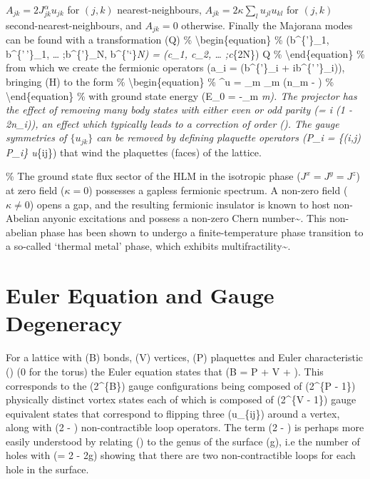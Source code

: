 \(A_{jk}=2J^\alpha_{jk}u_{jk}\) for \((j, k)\) nearest-neighbours,
\(A_{jk}=2\kappa\sum_l u_{jl}u_{kl}\) for \((j,k)\)
second-nearest-neighbours, and \(A_{jk}=0\) otherwise. Finally the
Majorana modes can be found with a transformation (Q) \%
\textbackslash begin\{equation\} \% (b\^{}\{'\}\_1, b\^{}\{'\,'\}\_1,
\ldots{} ;b\^{}\{'\}\_N, b\^{}\{'`\}\emph{N) = (c\_1, c\_2, \ldots{}
;c}\{2N\}) Q \% \textbackslash end\{equation\} \% from which we create
the fermionic operators (a\_i =  (b\^{}\{'\}\_i +
ib\^{}\{'\,'\}\_i)), bringing (H) to the form \%
\textbackslash begin\{equation\} \% \^{}u =
\sum\_m \epsilon\_m (n\_m - ) \%
\textbackslash end\{equation\} \% with ground state energy (E\_0 =
-\sum\_m \epsilon\emph{m). The projector has the effect of
removing many body states with either even or odd parity (\pi =
\prod\emph{i (1 - 2n\_i)), an effect which typically leads to a
correction of order (). The gauge symmetries of
\(\{u_{jk}\}\) can be removed by defining plaquette operators (P\_i =
\prod}\{(i,j) \in P\_i\} u}\{ij\}) that wind the plaquettes (faces) of
the lattice.

\% The ground state flux sector of the HLM in the isotropic phase
(\(J^x = J^y = J^z\)) at zero field (\(\kappa=0\)) possesses a gapless
fermionic spectrum. A non-zero field (\(\kappa\neq0\)) opens a gap, and
the resulting fermionic insulator is known to host non-Abelian anyonic
excitations and possess a non-zero Chern
number\textasciitilde{}\cite{kitaevAnyonsExactlySolved2006}. This
non-abelian phase has been shown to undergo a finite-temperature phase
transition to a so-called `thermal metal' phase, which exhibits
multifractility\textasciitilde{}\cite{selfThermallyInducedMetallic2019}.

\section{Euler Equation and Gauge Degeneracy}

For a lattice with (B) bonds, (V) vertices, (P) plaquettes and Euler
characteristic (\xi) (0 for the torus) the Euler equation states that (B
= P + V + \xi). This corresponds to the (2\^{}\{B\}) gauge
configurations being composed of (2\^{}\{P - 1\}) physically distinct
vortex states each of which is composed of (2\^{}\{V - 1\}) gauge
equivalent states that correspond to flipping three (u\_\{ij\}) around a
vertex, along with (2 - \xi) non-contractible loop operators. The term
(2 - \xi) is perhaps more easily understood by relating (\xi) to the
genus of the surface (g), i.e the number of holes with (\xi = 2 - 2g)
showing that there are two non-contractible loops for each hole in the
surface.

